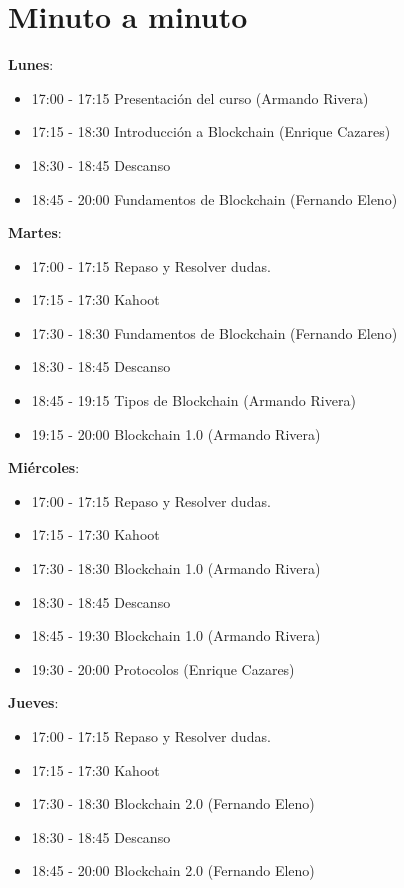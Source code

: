 \documentclass[a4paper,12pt]{/home/armando/Documentos/Cursos/LaTeX/Plantillas/lib/pub}
\begin{document}
\putLogo
\protecoTitle

\section{Minuto a minuto}

\textbf{Lunes}:
\begin{itemize}
	\item 17:00 - 17:15 Presentación del curso (Armando Rivera)
	\item 17:15 - 18:30 Introducción a Blockchain (Enrique Cazares)
	\item 18:30 - 18:45 Descanso
	\item 18:45 - 20:00 Fundamentos de Blockchain (Fernando Eleno)
\end{itemize}

\textbf{Martes}:
\begin{itemize}
	\item 17:00 - 17:15 Repaso y Resolver dudas.
	\item 17:15 - 17:30 Kahoot
	\item 17:30 - 18:30 Fundamentos de Blockchain (Fernando Eleno)
	\item 18:30 - 18:45 Descanso
	\item 18:45 - 19:15 Tipos de Blockchain (Armando Rivera)
	\item 19:15 - 20:00 Blockchain 1.0 (Armando Rivera)
\end{itemize}

\textbf{Miércoles}:
\begin{itemize}
	\item 17:00 - 17:15 Repaso y Resolver dudas.
	\item 17:15 - 17:30 Kahoot
	\item 17:30 - 18:30 Blockchain 1.0 (Armando Rivera)
	\item 18:30 - 18:45 Descanso
	\item 18:45 - 19:30 Blockchain 1.0 (Armando Rivera)
	\item 19:30 - 20:00 Protocolos (Enrique Cazares)
\end{itemize}

\textbf{Jueves}:
\begin{itemize}
	\item 17:00 - 17:15 Repaso y Resolver dudas.
	\item 17:15 - 17:30 Kahoot
	\item 17:30 - 18:30 Blockchain 2.0 (Fernando Eleno)
	\item 18:30 - 18:45 Descanso
	\item 18:45 - 20:00 Blockchain 2.0 (Fernando Eleno)
\end{itemize}
\end{document}
